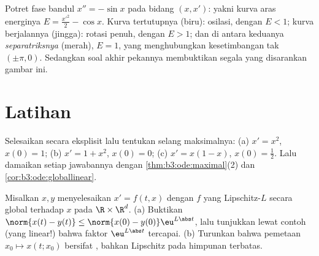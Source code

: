 \begin{omfigure}

{\small Potret fase bandul $x'' = -\sin x$ pada
bidang $(x, x')$: yakni kurva aras energinya $E = \frac{x'^2}2
- \cos x$. Kurva tertutupnya (biru): osilasi, dengan $E < 1$;
kurva berjalannya (jingga): rotasi penuh, dengan $E > 1$; dan di antara
keduanya \emph{separatriksnya} (merah), $E = 1$, yang menghubungkan
kesetimbangan tak  $(\pm\pi, 0)$. Sedangkan soal akhir pekannya membuktikan
segala yang disarankan gambar ini.}
\end{omfigure}

\section{Latihan}

\begin{exercise}[$\star$]\label{exo:b3:ode:1}
Selesaikan secara eksplisit lalu tentukan selang maksimalnya:
(a) $x' = x^2$, $x(0) = 1$; (b) $x' = 1 + x^2$, $x(0) = 0$;
(c) $x' = x(1-x)$, $x(0) = \frac12$. Lalu damaikan setiap jawabannya
dengan \cref{thm:b3:ode:maximal}(2) dan
\cref{cor:b3:ode:globallinear}.
\end{exercise}

\begin{exercise}[$\star$]\label{exo:b3:ode:2}
Misalkan $x, y$ menyelesaikan $x' = f(t,x)$ dengan $f$ yang Lipschitz-$L$
secara global terhadap $x$ pada $\R\times\R^d$.
(a) Buktikan $\norm{x(t) - y(t)} \leq \norm{x(0) -
y(0)}\eu^{L\abs t}$, lalu tunjukkan lewat contoh (yang linear!) bahwa
faktor $\eu^{L\abs t}$ tercapai.
(b) Turunkan bahwa pemetaan  $x_0 \mapsto x(t; x_0)$ bersifat
, bahkan Lipschitz pada himpunan terbatas.
\end{exercise}

